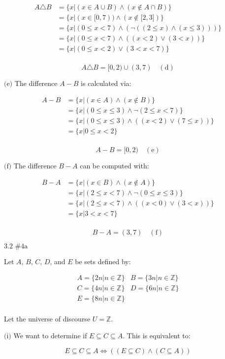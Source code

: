 \documentclass{article}
\newcommand{\problem}[2]{$\boxed{\text{#1 \##2}}$}
\newcommand{\subproblem}[1]{$\boxed{\text{(#1)}}$}
\newcommand{\subsolution}[2]{\boxed{#2\quad(\text{#1})}}
\newcommand{\multistep}[1]{\begin{array}{rl} #1 \end{array}}
\begin{document}
\begin{multicols*}{2}
\[
\multistep{
A\triangle B&=\{x|(x\in A\cup B)\wedge(x\not\in A\cap B)\} \\
&=\{x|(x\in\lbrack0,7))\wedge(x\not\in \lbrack2,3\rbrack)\} \\
&=\{x|(0\le x<7)\wedge(\neg((2\le x)\wedge(x\le 3)))\} \\
&=\{x|(0\le x<7)\wedge((x<2)\vee(3<x))\} \\
&=\{x|(0\le x<2)\vee(3<x<7)\} \\
}
\]

\[
\subsolution{d}{A\triangle B=\lbrack0,2)\cup(3,7)}
\]

%
\subproblem{e} The difference $A-B$ is calculated via:

\[
\multistep{
A-B&=\{x|(x\in A)\wedge(x\not\in B)\} \\
&=\{x|(0\le x\le 3)\wedge\neg(2\le x<7)\} \\
&=\{x|(0\le x\le 3)\wedge((x<2)\vee(7\le x))\} \\
&=\{x|0\le x<2\} \\
}
\]

\[
\subsolution{e}{A-B=\lbrack0,2)}
\]

%
\subproblem{f} The difference $B-A$ can be computed with:

\[
\multistep{
B-A&=\{x|(x\in B)\wedge(x\not\in A)\} \\
&=\{x|(2\le x<7)\wedge\neg(0\le x\le 3)\} \\
&=\{x|(2\le x<7)\wedge((x<0)\vee(3<x))\} \\
&=\{x|3<x<7\} \\
}
\]

\[
\subsolution{f}{B-A=(3,7)}
\]

%
\problem{3.2}{4a}

Let $A$, $B$, $C$, $D$, and $E$ be sets defined by:

\[
\begin{array}{cc}
A=\{2n|n\in\mathbb{Z}\} & B=\{3n|n\in\mathbb{Z}\} \\
C=\{4n|n\in\mathbb{Z}\} & D=\{6n|n\in\mathbb{Z}\} \\
E=\{8n|n\in\mathbb{Z}\} & \\
\end{array}
\]

Let the universe of discourse $U=\mathbb{Z}$.

%
\subproblem{i} We want to determine if
$E\subseteq{}C\subseteq{}A$. This is equivalent to:

\[
E\subseteq{}C\subseteq{}A\Leftrightarrow((E\subseteq C)\wedge(C\subseteq A))
\]


\end{multicols*}
\end{document}
